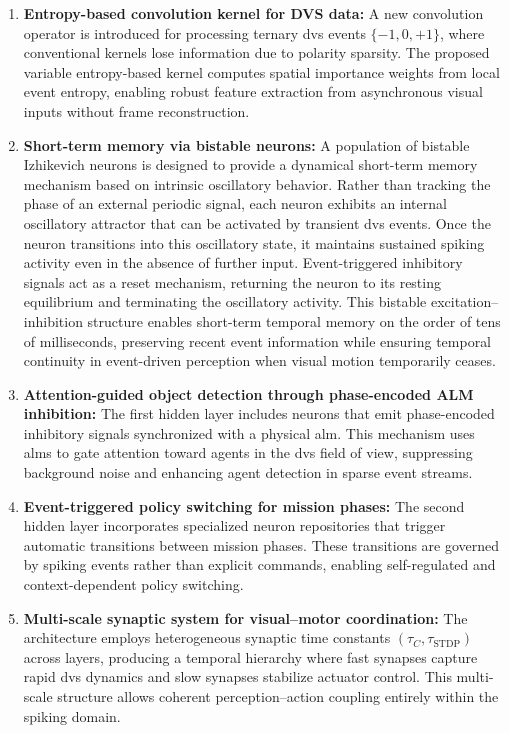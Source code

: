 \begin{enumerate}
    \item \textbf{Entropy-based convolution kernel for DVS data:}  
    A new convolution operator is introduced for processing ternary \ac{dvs} events $\{-1,0,+1\}$, where conventional kernels lose information due to polarity sparsity.  
    The proposed variable entropy-based kernel computes spatial importance weights from local event entropy, enabling robust feature extraction from asynchronous visual inputs without frame reconstruction.

    \item \textbf{Short-term memory via bistable neurons:}  
    A population of bistable Izhikevich neurons is designed to provide a dynamical short-term memory mechanism based on intrinsic oscillatory behavior. Rather than tracking the phase of an external periodic signal, each neuron exhibits an internal oscillatory attractor that can be activated by transient \ac{dvs} events. Once the neuron transitions into this oscillatory state, it maintains sustained spiking activity even in the absence of further input. Event-triggered inhibitory signals act as a reset mechanism, returning the neuron to its resting equilibrium and terminating the oscillatory activity. This bistable excitation–inhibition structure enables short-term temporal memory on the order of tens of milliseconds, preserving recent event information while ensuring temporal continuity in event-driven perception when visual motion temporarily ceases.

    \item \textbf{Attention-guided object detection through phase-encoded ALM inhibition:}  
    The first hidden layer includes neurons that emit phase-encoded inhibitory signals synchronized with a physical \ac{alm}. This mechanism uses \ac{alm}s to gate attention toward agents in the \ac{dvs} field of view, suppressing background noise and enhancing agent detection in sparse event streams.

    \item \textbf{Event-triggered policy switching for mission phases:}  
    The second hidden layer incorporates specialized neuron repositories that trigger automatic transitions between mission phases. These transitions are governed by spiking events rather than explicit commands, enabling self-regulated and context-dependent policy switching.

    \item \textbf{Multi-scale synaptic system for visual–motor coordination:}  
    The architecture employs heterogeneous synaptic time constants $(\tau_C, \tau_{\mathrm{STDP}})$ across layers, producing a temporal hierarchy where fast synapses capture rapid \ac{dvs} dynamics and slow synapses stabilize actuator control. This multi-scale structure allows coherent perception–action coupling entirely within the spiking domain.

\end{enumerate}

